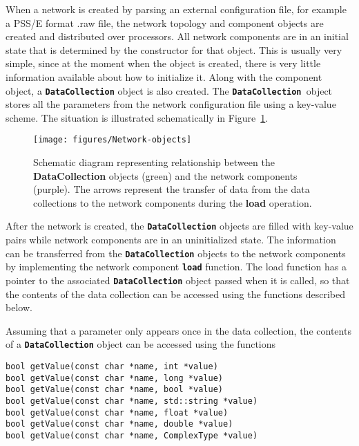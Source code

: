 When a network is created by parsing an external configuration file, for example
a PSS/E format .raw file, the network topology and component objects are created
and distributed over processors. All network components are in an initial state
that is determined by the constructor for that object. This is usually very
simple, since at the moment when the object is created, there is very little
information available about how to initialize it. Along with the component
object, a \texttt{\textbf{DataCollection}} object is also created. The
\texttt{\textbf{DataCollection }}object stores all the parameters from the
network configuration file using a key-value scheme. The situation is
illustrated schematically in Figure~\ref{fig:data-schematic}.

\begin{figure}
  \centering
    \texttt{[image: figures/Network-objects]}
  \caption{Schematic diagram representing relationship between the \textbf{DataCollection} objects (green) and the network components (purple). The arrows represent the transfer of data from the data collections to the network components during the \textbf{load} operation.}
  \label{fig:data-schematic}
\end{figure}

After the network is created, the \texttt{\textbf{DataCollection}} objects are filled with key-value pairs while network components are in an uninitialized state. The information can be transferred from the \texttt{\textbf{DataCollection}} objects to the network components by implementing the network component \texttt{\textbf{load}} function. The load function has a pointer to the associated \texttt{\textbf{DataCollection}} object passed when it is called, so that the contents of the data collection can be accessed using the functions described below.

Assuming that a parameter only appears once in the data collection, the contents of a \texttt{\textbf{DataCollection}} object can be accessed using the functions

{
\color{red}
\begin{Verbatim}[fontseries=b]
bool getValue(const char *name, int *value)
bool getValue(const char *name, long *value)
bool getValue(const char *name, bool *value)
bool getValue(const char *name, std::string *value)
bool getValue(const char *name, float *value)
bool getValue(const char *name, double *value)
bool getValue(const char *name, ComplexType *value)
\end{Verbatim}
}

